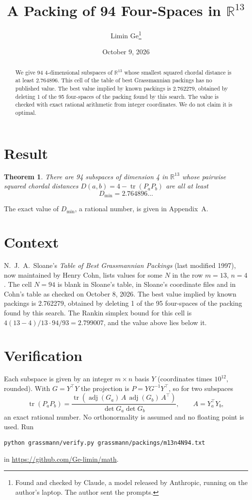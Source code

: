 \documentclass[11pt,a4paper]{article}
\title{A Packing of 94 Four-Spaces in $\mathbb{R}^{13}$}
\author{Limin Ge\thanks{Found and checked by Claude, a model released by Anthropic, running on the author's laptop. The author sent the prompts.}}
\date{October 9, 2026}
\newtheorem*{theorem}{Theorem}
\begin{document}
\maketitle
\begin{abstract}
We give 94 4-dimensional subspaces of $\mathbb{R}^{13}$ whose smallest squared chordal distance is at least 2.764896. This cell of the table of best Grassmannian packings has no published value. The best value implied by known packings is 2.762279, obtained by deleting 1 of the 95 four-spaces of the packing found by this search. The value is checked with exact rational arithmetic from integer coordinates. We do not claim it is optimal.
\end{abstract}

\section{Result}
\begin{theorem}
There are 94 subspaces of dimension 4 in $\mathbb{R}^{13}$ whose pairwise squared chordal distances $D(a,b) = 4 - \operatorname{tr}(P_aP_b)$ are all at least
\[ D_{\min} = 2.764896\ldots \]
\end{theorem}
The exact value of $D_{\min}$, a rational number, is given in Appendix~A.


\section{Context}
N.~J.~A.~Sloane's \emph{Table of Best Grassmannian Packings} (last modified 1997), now maintained by Henry Cohn, lists values for some $N$ in the row $m=13$, $n=4$. The cell $N=94$ is blank in Sloane's table, in Sloane's coordinate files and in Cohn's table as checked on October 8, 2026. The best value implied by known packings is 2.762279, obtained by deleting 1 of the 95 four-spaces of the packing found by this search. The Rankin simplex bound for this cell is $4(13-4)/13\cdot 94/93 = 2.799007$, and the value above lies below it.


\section{Verification}
Each subspace is given by an integer $m\times n$ basis $Y$ (coordinates times $10^{12}$, rounded). With $G=Y^\top Y$ the projection is $P=YG^{-1}Y^\top$, so for two subspaces
\[ \operatorname{tr}(P_aP_b)=\frac{\operatorname{tr}(\operatorname{adj}(G_a)\,A\,\operatorname{adj}(G_b)\,A^\top)}{\det G_a\det G_b},\qquad A=Y_a^\top Y_b, \]
an exact rational number. No orthonormality is assumed and no floating point is used. Run
\begin{verbatim}
python grassmann/verify.py grassmann/packings/m13n4N94.txt
\end{verbatim}
in \url{https://github.com/Ge-limin/math}.
\end{document}
